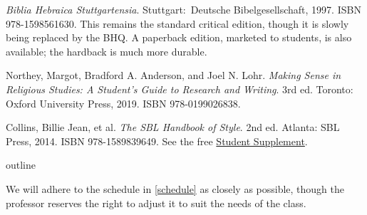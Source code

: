 \documentclass[titlepage]{article}
\begin{document}
\begingroup
\renewcommand{\section}[2]{}%
\begin{thebibliography}{Making Sense}%

    \emph{Biblia Hebraica Stuttgartensia}.
    Stuttgart: Deutsche Bibel\-ge\-sell\-schaft, 1997. ISBN 978-1598561630.
    This remains the standard critical edition, though it is slowly
    being replaced by the BHQ. A paperback edition, marketed to
    students, is also available; the hardback is much more durable.

	 Northey, Margot, Bradford A. Anderson, and Joel N. Lohr.
	\emph{Making Sense in Religious Studies: A Student's Guide to Research and Writing}.
	3rd ed. Toronto: Oxford University Press, 2019. ISBN 978-0199026838.

	 Collins, Billie Jean, et al.
	\emph{The SBL Handbook of Style}.
	2nd ed. Atlanta: SBL Press, 2014. ISBN 978-1589839649. See the free
	\href{https://www.sbl-site.org/assets/pdfs/pubs/SBLHSsupp2015-02.pdf}{Student Supplement}.

\end{thebibliography}
\endgroup

\section{Course Outline}
\label{outline}

We will adhere to the schedule in \autoref{schedule} as closely as
possible, though the professor reserves the right to adjust it to suit
the needs of the class.
\end{document}
